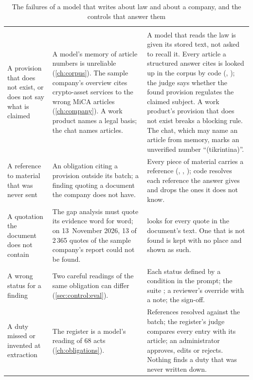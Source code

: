 \begin{xltabular}{\textwidth}{@{}L{34mm}YL{50mm}@{}}
\caption{The failures of a model that writes about law and about a company, and the controls that answer them}\label{tab:control:risks}\\
\toprule
{} &  &  \\
\midrule
\endfirsthead
\toprule
{} &  &  \\
\midrule
\endhead
\bottomrule
\endlastfoot
A provision that does not exist, or does not say what is claimed & A model's memory of article numbers is unreliable (\cref{ch:corpus}). The sample company's overview cites crypto-asset services to the wrong MiCA articles (\cref{ch:company}). A work product names a legal basis; the chat names articles. & A model that reads the law is given its stored text, not asked to recall it. Every article a structured answer cites is looked up in the corpus by code (, ); the judge  says whether the found provision regulates the claimed subject. A work product's provision that does not exist breaks a blocking rule. The chat, which may name an article from memory, marks an unverified number \enquote{(tikrintina)}. \\
A reference to material that was never sent & An obligation citing a provision outside its batch; a finding quoting a document the company does not have. & Every piece of material carries a reference (, , ); code resolves each reference the answer gives and drops the ones it does not know. \\
A quotation the document does not contain & The gap analysis must quote its evidence word for word; on 13~November 2026, 13 of 2\,365 quotes of the sample company's report could not be found. &  looks for every quote in the document's text. One that is not found is kept with no place and shown as such. \\
A wrong status for a finding & Two careful readings of the same obligation can differ (\cref{sec:control:eval}). & Each status defined by a condition in the prompt; the suite ; a reviewer's override with a note; the sign-off. \\
A duty missed or invented at extraction & The register is a model's reading of 68 acts (\cref{ch:obligations}). & References resolved against the batch; the register's judge compares every entry with its article; an administrator approves, edits or rejects. Nothing finds a duty that was never written down. \\

\end{xltabular}
